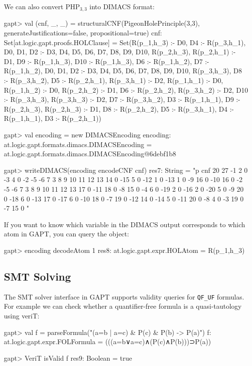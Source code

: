 \documentclass[a4paper,11pt]{article}
\newcommand{\cli}[1]{{\ttfamily {#1}}}
\begin{document}
We can also convert $\mathrm{PHP}_{3,3}$ into DIMACS format:
\begin{clilisting}
gapt> val (cnf, _, _) = structuralCNF(PigeonHolePrinciple(3,3), generateJustifications=false, propositional=true)
cnf: Set[at.logic.gapt.proofs.HOLClause] = Set(R(p_1,h_3) :- D0, D4 :- R(p_3,h_1), D0, D1, D2 :- D3, D4, D5, D6, D7, D8, D9, D10, R(p_2,h_3), R(p_2,h_1) :- D1, D9 :- R(p_1,h_3), D10 :- R(p_1,h_3), D6 :- R(p_1,h_2), D7 :- R(p_1,h_2), D0, D1, D2 :- D3, D4, D5, D6, D7, D8, D9, D10, R(p_3,h_3), D8 :- R(p_3,h_2), D5 :- R(p_2,h_1), R(p_3,h_1) :- D2, R(p_1,h_1) :- D0, R(p_1,h_2) :- D0, R(p_2,h_2) :- D1, D6 :- R(p_2,h_2), R(p_3,h_2) :- D2, D10 :- R(p_3,h_3), R(p_3,h_3) :- D2, D7 :- R(p_3,h_2), D3 :- R(p_1,h_1), D9 :- R(p_2,h_3), R(p_2,h_3) :- D1, D8 :- R(p_2,h_2), D5 :- R(p_3,h_1), D4 :- R(p_1,h_1), D3 :- R(p_2,h_1))

gapt> val encoding = new DIMACSEncoding
encoding: at.logic.gapt.formats.dimacs.DIMACSEncoding = at.logic.gapt.formats.dimacs.DIMACSEncoding@6debf1b8

gapt> writeDIMACS(encoding encodeCNF cnf)
res7: String =
"p cnf 20 27
-1 2 0
-3 4 0
-2 -5 -6 7 3 8 9 10 11 12 13 14 0
-15 5 0
-12 1 0
-13 1 0
-9 16 0
-10 16 0
-2 -5 -6 7 3 8 9 10 11 12 13 17 0
-11 18 0
-8 15 0
-4 6 0
-19 2 0
-16 2 0
-20 5 0
-9 20 0
-18 6 0
-13 17 0
-17 6 0
-10 18 0
-7 19 0
-12 14 0
-14 5 0
-11 20 0
-8 4 0
-3 19 0
-7 15 0
"

\end{clilisting}

If you want to know which variable in the DIMACS output corresponds to which
atom in GAPT, you can query the \cli{DIMACSEncoding} object:
\begin{clilisting}
gapt> encoding decodeAtom 1
res8: at.logic.gapt.expr.HOLAtom = R(p_1,h_3)

\end{clilisting}

\subsection{SMT Solving}

The SMT solver interface in GAPT supports validity queries for \verb,QF_UF,
formulas.  For example we can check whether a quantifier-free formula is a
quasi-tautology using veriT:
\begin{clilisting}
gapt> val f = parseFormula("(a=b | a=c) & P(c) & P(b) -> P(a)")
f: at.logic.gapt.expr.FOLFormula = (((a=b∨a=c)∧(P(c)∧P(b)))⊃P(a))

gapt> VeriT isValid f
res9: Boolean = true

\end{clilisting}
\end{document}
